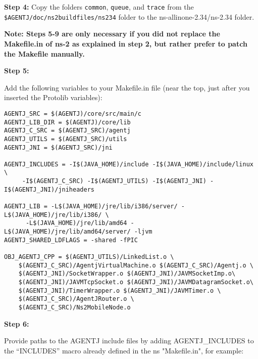 
\vspace{0.1in}

\noindent \textbf{Step 4:}
Copy the folders \texttt{common}, \texttt{queue}, and \texttt{trace} from the \texttt{\$AGENTJ/doc/ns2buildfiles/ns234} folder to the ns-allinone-2.34/ns-2.34 folder.


\textbf{Note: Steps 5-9 are only necessary if you did not replace the Makefile.in of ns-2 as explained in step 2, but rather prefer to patch the Makefile manually.}

\vspace{0.3in}

\noindent \textbf{Step 5:}

Add the following variables to your Makefile.in file (near the top, just after you inserted the Protolib variables): 

 
\footnotesize
\begin{verbatim}
AGENTJ_SRC = $(AGENTJ)/core/src/main/c
AGENTJ_LIB_DIR = $(AGENTJ)/core/lib
AGENTJ_C_SRC = $(AGENTJ_SRC)/agentj
AGENTJ_UTILS = $(AGENTJ_SRC)/utils
AGENTJ_JNI = $(AGENTJ_SRC)/jni

AGENTJ_INCLUDES = -I$(JAVA_HOME)/include -I$(JAVA_HOME)/include/linux \
     -I$(AGENTJ_C_SRC) -I$(AGENTJ_UTILS) -I$(AGENTJ_JNI) -I$(AGENTJ_JNI)/jniheaders

AGENTJ_LIB = -L$(JAVA_HOME)/jre/lib/i386/server/ -L$(JAVA_HOME)/jre/lib/i386/ \ 
      -L$(JAVA_HOME)/jre/lib/amd64 -L$(JAVA_HOME)/jre/lib/amd64/server/ -ljvm
AGENTJ_SHARED_LDFLAGS = -shared -fPIC

OBJ_AGENTJ_CPP = $(AGENTJ_UTILS)/LinkedList.o \
    $(AGENTJ_C_SRC)/AgentjVirtualMachine.o $(AGENTJ_C_SRC)/Agentj.o \
    $(AGENTJ_JNI)/SocketWrapper.o $(AGENTJ_JNI)/JAVMSocketImp.o\
    $(AGENTJ_JNI)/JAVMTcpSocket.o $(AGENTJ_JNI)/JAVMDatagramSocket.o\
    $(AGENTJ_JNI)/TimerWrapper.o $(AGENTJ_JNI)/JAVMTimer.o \
    $(AGENTJ_C_SRC)/AgentJRouter.o \
    $(AGENTJ_C_SRC)/Ns2MobileNode.o	
\end{verbatim}
\normalsize
	
\vspace{0.1in}
\noindent \textbf{Step 6:}

Provide paths to the AGENTJ include files by adding AGENTJ\_INCLUDES to the ``INCLUDES'' macro  already defined in the  ns "Makefile.in", for example:
    
